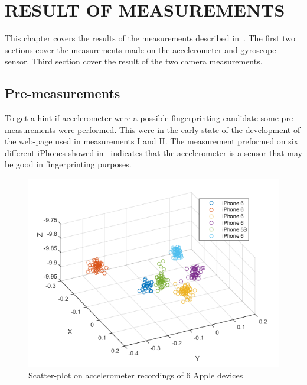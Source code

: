 \chapter{RESULT OF MEASUREMENTS}\label{cha:result}
This chapter covers the results of the measurements described in~. The first two sections cover the measurements made on the accelerometer and gyroscope sensor. Third section cover the result of the two camera measurements.

\section{Pre-measurements}
To get a hint if accelerometer were a possible fingerprinting candidate some pre-measurements were performed. This were in the early state of the development of the web-page used in measurements I and II. The measurement preformed on six different iPhones showed in~ indicates that the accelerometer is a sensor that may be good in fingerprinting purposes.
\begin{figure}[ht]
\centering
\includegraphics[scale=.6]{img/scatteriPhone}
\caption{Scatter-plot on accelerometer recordings of 6 Apple devices}
\label{fig:iPhoneScatter}
\end{figure}

